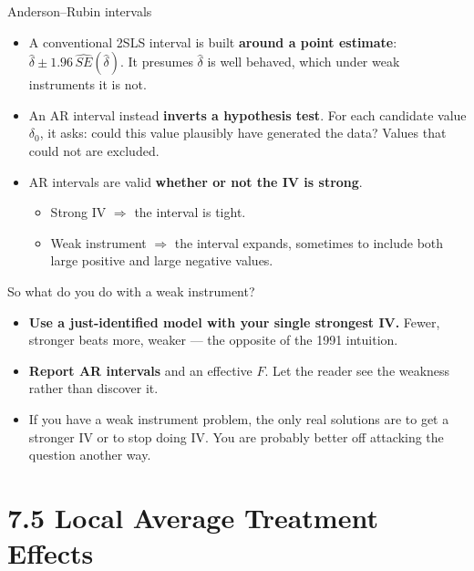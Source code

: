 \documentclass[
  11pt,
  ignorenonframetext,
  aspectratio=169,
]{beamer}
\providecommand{\tightlist}{%
  \setlength{\itemsep}{0pt}\setlength{\parskip}{0pt}}
\begin{document}
\begin{frame}{Anderson--Rubin intervals}
\protect{}\label{andersonrubin-intervals}
\begin{itemize}
\tightlist
\item
  A conventional 2SLS interval is built \textbf{around a point
  estimate}: \(\hat\delta \pm 1.96\,\widehat{SE}(\hat{\delta})\). It
  presumes \(\hat\delta\) is well behaved, which under weak instruments
  it is not.
\item
  An AR interval instead \textbf{inverts a hypothesis test}. For each
  candidate value \(\delta_0\), it asks: could this value plausibly have
  generated the data? Values that could not are excluded.
\item
  AR intervals are valid \textbf{whether or not the IV is strong}.

  \begin{itemize}
  \tightlist
  \item
    Strong IV \(\Rightarrow\) the interval is tight.
  \item
    Weak instrument \(\Rightarrow\) the interval expands, sometimes to
    include both large positive and large negative values.
  \end{itemize}
\end{itemize}
\end{frame}

\begin{frame}{So what do you do with a weak instrument?}
\protect{}\label{so-what-do-you-do-with-a-weak-instrument}
\begin{itemize}
\tightlist
\item
  \textbf{Use a just-identified model with your single strongest IV.}
  Fewer, stronger beats more, weaker --- the opposite of the 1991
  intuition.
\item
  \textbf{Report AR intervals} and an effective \(F\). Let the reader
  see the weakness rather than discover it.
\item
  If you have a weak instrument problem, the only real solutions are to
  get a stronger IV or to stop doing IV. You are probably better off
  attacking the question another way.
\end{itemize}
\end{frame}

\section{7.5 Local Average Treatment
Effects}\label{local-average-treatment-effects}
\end{document}

